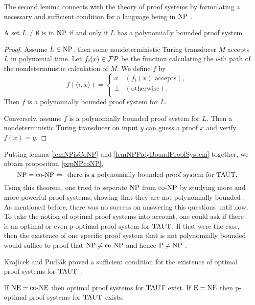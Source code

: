   The second lemma connects with the theory of proof systems by formulating a necessary and sufficient condition for a language being in \(\text{NP}\) \cite{CR79}.

  \begin{lemma} \label{lemNPPolyBoundProofSystem}
    A set \(L \neq \emptyset\) is in \(\text{NP}\) if and only if \(L\) has a polynomially bounded proof system.
  \end{lemma}

  \begin{proof}
   Assume \(L \in \text{NP}\), then some nondeterministic Turing transducer \(M\) accepts \(L\) in polynomial time. Let \(f_i(x) \in \mathcal{FP}\) be the function calculating the \(i\)-th path of the nondeterministic calculation of \(M\). We define \(f\) by
   \[
     f(\langle i, x \rangle) =
     \begin{cases}
       x & (f_i(x) \text{ accepts}), \\
       \perp & (\text{otherwise}). \\
     \end{cases}
   \]
   Then \(f\) is a polynomially bounded proof system for \(L\).

   Conversely, assume \(f\) is a polynomially bounded proof system for \(L\). Then a nondeterministic Turing transducer on input \(y\) can guess a proof \(x\) and verify \(f(x) = y\).
  \end{proof}

  Putting lemma \ref{lemNPisCoNP} and \ref{lemNPPolyBoundProofSystem} together, we obtain proposition \ref{prpNPcoNP},
  \[
    \text{NP} = \text{co-NP} \Leftrightarrow \text{ there is a polynomially bounded proof system for } \text{TAUT}.
  \]
  Using this theorem, one tried to seperate \(\text{NP}\) from \(\text{co-NP}\) by studying more and more powerful proof systems, showing that they are not polynomially bounded \cite{KMT03}. As mentioned before, there was no success on answering this questions until now. To take the notion of optimal proof systems into account, one could ask if there is an optimal or even p-optimal proof system for \(\text{TAUT}\). If that were the case, then the existence of one specific proof system that is not polynomially bounded would suffice to proof that \(\text{NP} \neq \text{co-NP}\) and hence \(\text{P} \neq \text{NP}\) \cite{KMT03}.

  Kraj\'{\i}cek and Pudl{\'a}k proved a sufficient condition for the existence of optimal proof systems for \(\text{TAUT}\) \cite{KP89}.

  \begin{theorem}
    If \(\text{NE} = \text{co-NE}\) then optimal proof systems for \(\text{TAUT}\) exist. If \(\text{E} = \text{NE}\) then p-optimal proof systems for \(\text{TAUT}\) exists.
  \end{theorem}

